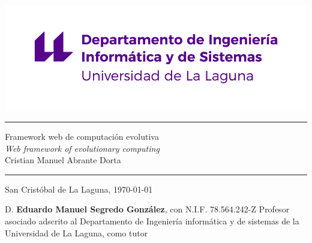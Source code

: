 \documentclass[spanish,a4paper,12pt,oneside]{extreport}
\begin{document}

\pagestyle{empty}
\thispagestyle{empty}


\newcommand{\HRule}{\rule{\linewidth}{1mm}}
\setlength{\parindent}{0mm}
\setlength{\parskip}{0mm}


\begin{center}
    \includegraphics[scale=0.8]{images/etsit-logo.png}\\[10mm]
\end{center}

\HRule
\begin{flushright}
        {\Huge Framework web de computación evolutiva} \\[2.5mm]
        {\Large \textit{Web framework of evolutionary computing}} \\[5mm]
        {\Large Cristian Manuel Abrante Dorta} \\[5mm]


\end{flushright}
\HRule
{}
\begin{center}
  \Large San Cristóbal de La Laguna, \today
\end{center}

\setlength{\parindent}{5mm}

\newpage
\thispagestyle{empty}

D. {\bf Eduardo Manuel Segredo González}, con N.I.F. 78.564.242-Z
Profesor asociado adscrito al Departamento
de Ingeniería informática y de sistemas
de la Universidad de La Laguna, como tutor
\end{document}
